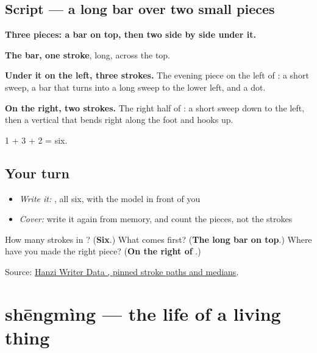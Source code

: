 \subsection*{Script — a long bar over two small pieces}

\begin{quote}
\end{quote}

\textbf{Three pieces: a bar on top, then two side by side under it.}

\textbf{The bar, one stroke}, long, across the top.

\textbf{Under it on the left, three strokes.} The evening piece on the left of : a short sweep, a bar that turns into a long sweep to the lower left, and a dot.

\textbf{On the right, two strokes.} The right half of : a short sweep down to the left, then a vertical that bends right along the foot and hooks up.

1 + 3 + 2 = six.

\subsection*{Your turn}
\begin{itemize}
\raggedright
  \item \emph{Write it:} , all six, with the model in front of you
  \item \emph{Cover:} write it again from memory, and count the pieces, not the strokes
\end{itemize}

\begin{tcolorbox}[breakable,colback=teal!4,colframe=teal!35!black,title={Before you move on}]
How many strokes in ? (\textbf{Six}.) What comes first? (\textbf{The long bar on top}.) Where have you made the right piece? (\textbf{On the right of }.)

Source: \href{https://raw.githubusercontent.com/chanind/hanzi-writer-data/68d10a4b21150cae5e1ebbd223eed289cf32d90c/data/\%E6\%AD\%BB.json}{Hanzi Writer Data , pinned stroke paths and medians}.
\end{tcolorbox}
\section[shēngmìng]{shēngmìng — the life of a living thing}

